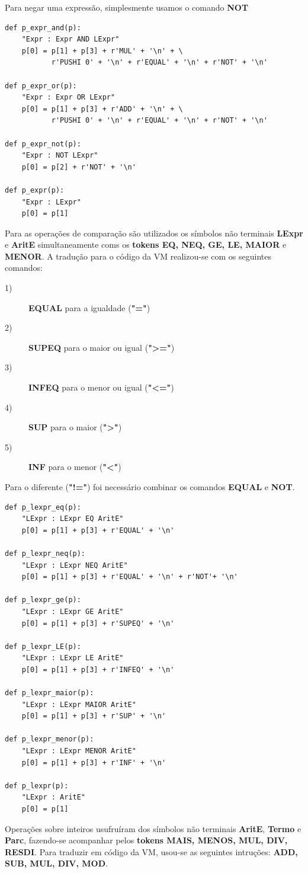 \documentclass{article}
\begin{document}
Para negar uma expressão, simplesmente usamos o comando \textbf{NOT}

\begin{lstlisting}[firstnumber=384]
def p_expr_and(p):
    "Expr : Expr AND LExpr"
    p[0] = p[1] + p[3] + r'MUL' + '\n' + \
           r'PUSHI 0' + '\n' + r'EQUAL' + '\n' + r'NOT' + '\n'

def p_expr_or(p):
    "Expr : Expr OR LExpr"
    p[0] = p[1] + p[3] + r'ADD' + '\n' + \
           r'PUSHI 0' + '\n' + r'EQUAL' + '\n' + r'NOT' + '\n' 

def p_expr_not(p):
    "Expr : NOT LExpr"
    p[0] = p[2] + r'NOT' + '\n'

def p_expr(p):
    "Expr : LExpr"
    p[0] = p[1]
\end{lstlisting}

\par Para as operações de comparação são utilizados os símbolos não terminais \textbf{LExpr} e \textbf{AritE} simultaneamente coms os \textbf{tokens EQ, NEQ, GE, LE, MAIOR} e \textbf{MENOR}. A tradução para o código da VM realizou-se com os seguintes comandos:

\begin{description}
\item[1)]\textbf{EQUAL} para a igualdade (\textbf{"="})
\item[2)]\textbf{SUPEQ} para o maior ou igual (\textbf{"\textgreater="})
\item[3)]\textbf{INFEQ} para o menor ou igual (\textbf{"\textless="})
\item[4)]\textbf{SUP} para o maior (\textbf{"\textgreater"})
\item[5)]\textbf{INF} para o menor (\textbf{"\textless"})
\end{description}

Para o diferente (\textbf{"!="}) foi necessário combinar os comandos \textbf{EQUAL} e \textbf{NOT}.

\begin{lstlisting}[firstnumber=404]
def p_lexpr_eq(p):
    "LExpr : LExpr EQ AritE"
    p[0] = p[1] + p[3] + r'EQUAL' + '\n'

def p_lexpr_neq(p):
    "LExpr : LExpr NEQ AritE"
    p[0] = p[1] + p[3] + r'EQUAL' + '\n' + r'NOT'+ '\n'

def p_lexpr_ge(p):
    "LExpr : LExpr GE AritE"
    p[0] = p[1] + p[3] + r'SUPEQ' + '\n'

def p_lexpr_LE(p):
    "LExpr : LExpr LE AritE"
    p[0] = p[1] + p[3] + r'INFEQ' + '\n'

def p_lexpr_maior(p):
    "LExpr : LExpr MAIOR AritE"
    p[0] = p[1] + p[3] + r'SUP' + '\n'

def p_lexpr_menor(p):
    "LExpr : LExpr MENOR AritE"
    p[0] = p[1] + p[3] + r'INF' + '\n'

def p_lexpr(p):
    "LExpr : AritE"
    p[0] = p[1]
\end{lstlisting}
\clearpage
Operações sobre inteiros usufruíram dos símbolos não terminais \textbf{AritE}, \textbf{Termo} e \textbf{Parc}, fazendo-se acompanhar pelos \textbf{tokens MAIS, MENOS, MUL, DIV, RESDI}. Para traduzir em código da VM, usou-se as seguintes intruções: \textbf{ADD, SUB, MUL, DIV, MOD}.
\end{document}
